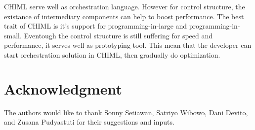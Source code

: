 \documentclass[conference]{IEEEtran}
\begin{document}
CHIML serve well as orchestration language. However for control structure, the existance of intermediary components can help to boost performance. The best trait of CHIML is it's support for programming-in-large and programming-in-small. Eventough the control structure is still suffering for speed and performance, it serves well as prototyping tool. This mean that the developer can start orchestration solution in CHIML, then gradually do optimization.


\section*{Acknowledgment}

The authors would like to thank Sonny Setiawan, Satriyo Wibowo, Dani Devito, and Zusana Pudyastuti for their suggestions and inputs.

\ifCLASSOPTIONcaptionsoff
  \newpage
\fi




\end{document}
